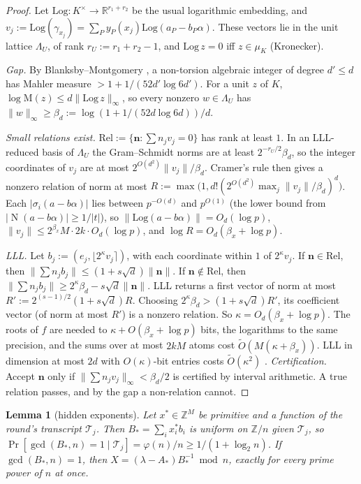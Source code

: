 \documentclass[11pt]{amsart}
\newtheorem{lemma}[theorem]{Lemma}
\theoremstyle{definition}
\newcommand{\Z}{\mathbb{Z}}
\newcommand{\R}{\mathbb{R}}
\newcommand{\cT}{\mathcal{T}}
\newcommand{\Prob}{\Pr}
\newcommand{\Norm}{\operatorname{N}}
\begin{document}
\begin{proof}
Let $\mathrm{Log}:K^\times\to\R^{r_1+r_2}$ be the usual logarithmic embedding, and $v_j:=\mathrm{Log}(\gamma_{x_j})=\sum_Py_P(x_j)\mathrm{Log}(a_P-b_P\alpha)$. These vectors
lie in the unit lattice $\Lambda_U$, of rank $r_U:=r_1+r_2-1$, and $\mathrm{Log}\,z=0$ iff $z\in\mu_K$ (Kronecker).

\emph{Gap.} By Blanksby--Montgomery \cite{blanksbymontgomery1971}, a non-torsion algebraic integer of degree $d'\le d$ has Mahler measure
$>1+1/(52d'\log6d')$. For a unit $z$ of $K$, $\log\mathrm M(z)\le d\|\mathrm{Log}\,z\|_\infty$, so every nonzero $w\in\Lambda_U$ has
$\|w\|_\infty\ge\beta_d:=\log(1+1/(52d\log6d))/d$.

\emph{Small relations exist.} $\mathrm{Rel}:=\{\mathbf n:\sum n_jv_j=0\}$ has rank at least $1$. In an LLL-reduced basis of $\Lambda_U$ the Gram--Schmidt norms are at least
$2^{-r_U/2}\beta_d$, so the integer coordinates of $v_j$ are at most $2^{O(d^2)}\|v_j\|/\beta_d$. Cramer's rule then gives a nonzero relation of norm at most
$R:=\max\bigl(1,d!(2^{O(d^2)}\max_j\|v_j\|/\beta_d)^d\bigr)$. Each $|\sigma_i(a-b\alpha)|$ lies between $p^{-O(d)}$ and $p^{O(1)}$ (the lower bound from
$|\Norm(a-b\alpha)|\ge1/|t|$), so $\|\mathrm{Log}(a-b\alpha)\|=O_d(\log p)$, $\|v_j\|\le2^{\beta_x}M\cdot2k\cdot O_d(\log p)$, and $\log R=O_d(\beta_x+\log p)$.

\emph{LLL.} Let $b_j:=(e_j,\lfloor2^\kappa v_j\rceil)$, with each coordinate within $1$ of $2^\kappa v_j$. If $\mathbf n\in\mathrm{Rel}$, then
$\|\sum n_jb_j\|\le(1+s\sqrt d)\|\mathbf n\|$. If $\mathbf n\notin\mathrm{Rel}$, then $\|\sum n_jb_j\|\ge2^\kappa\beta_d-s\sqrt d\|\mathbf n\|$. LLL returns a first vector of norm at
most $R':=2^{(s-1)/2}(1+s\sqrt d)R$. Choosing $2^\kappa\beta_d>(1+s\sqrt d)R'$, its coefficient vector (of norm at most $R'$) is a nonzero relation. So
$\kappa=O_d(\beta_x+\log p)$. The roots of $f$ are needed to $\kappa+O(\beta_x+\log p)$ bits, the logarithms to the same precision, and the sums over at most
$2kM$ atoms cost $\tilde O(M(\kappa+\beta_x))$. LLL in dimension at most $2d$ with $O(\kappa)$-bit entries costs $\tilde O(\kappa^2)$ \cite{nguyenstehle2009}.
\emph{Certification.} Accept $\mathbf n$ only if $\|\sum n_jv_j\|_\infty<\beta_d/2$ is certified by interval arithmetic. A true relation passes, and by the gap a
non-relation cannot.
\end{proof}

\begin{lemma}[hidden exponents]\label{lem:HX}
Let $x^*\in\Z^M$ be primitive and a function of the round's transcript $\cT_j$. Then $B_*=\sum_ix^*_ib_i$ is uniform on $\Z/n$ given $\cT_j$, so
$\Prob[\gcd(B_*,n)=1\mid\cT_j]=\varphi(n)/n\ge1/(1+\log_2n)$. If $\gcd(B_*,n)=1$, then $X=(\lambda-A_*)B_*^{-1}\bmod n$, exactly for every prime
power of $n$ at once.
\end{lemma}
\end{document}
